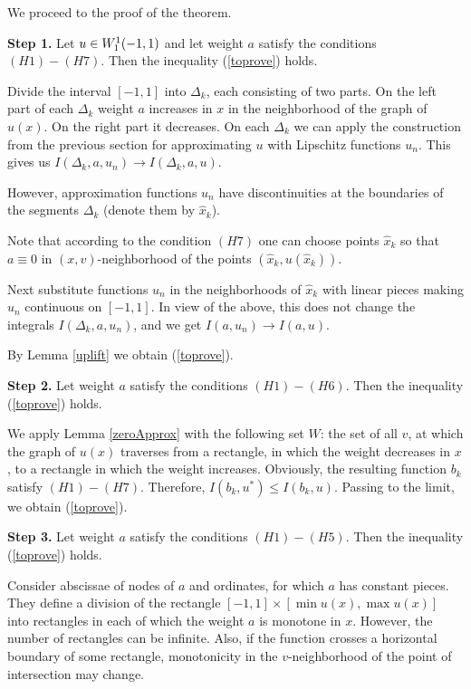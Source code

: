 We proceed to the proof of the theorem.

\bigskip
{\bf Step 1.} Let $u \in W_1^1(-1, 1)$ and let weight $a$ satisfy the conditions $(H1)-(H7)$.
Then the inequality (\ref{toprove}) holds.

Divide the interval $[-1, 1]$ into $\Delta_k$, each consisting of two parts.
On the left part of each $\Delta_k$ weight $a$ increases in $x$ in the neighborhood
of the graph of $u(x)$. On the right part it decreases.
On each $\Delta_k$ we can apply the construction from the previous section
for approximating $u$ with Lipschitz functions $u_n$.
This gives us $I(\Delta_k, a, u_n) \to I(\Delta_k, a, u)$.

However, approximation functions $u_n$ have discontinuities at the boundaries of the segments $\Delta_k$
(denote them by $\hat{x}_k$).

Note that according to the condition $(H7)$ one can choose points $\hat{x}_k$ so
that $a \equiv 0$ in $(x, v)$-neighborhood of the points $(\hat{x}_k, u(\hat{x}_k))$.

Next substitute functions $u_n$ in the neighborhoods of $\hat{x}_k$ with linear pieces
making $u_n$ continuous on $[-1, 1]$.
In view of the above, this does not change the integrals $I(\Delta_k, a, u_n)$,
and we get $I(a, u_n) \to I(a, u)$.

By Lemma \ref{uplift} we obtain (\ref{toprove}).

\bigskip

{\bf Step 2.} Let weight $a$ satisfy the conditions $(H1)-(H6)$.
Then the inequality (\ref{toprove}) holds.

We apply Lemma \ref{zeroApprox} with the following set $W$:
the set of all $v$, at which the graph of $u(x)$ traverses from a rectangle,
in which the weight decreases in $x$,
to a rectangle in which the weight increases.
Obviously, the resulting function $b_k$ satisfy $(H1)-(H7)$.
Therefore, $I(b_k, u^*) \le I(b_k, u)$.
Passing to the limit, we obtain (\ref{toprove}).

\bigskip

{\bf Step 3.} Let weight $a$ satisfy the conditions $(H1)-(H5)$.
Then the inequality (\ref{toprove}) holds.

Consider abscissae of nodes of $a$
and ordinates, for which $a$ has constant pieces.
They define a division of the rectangle $[-1, 1] \times [\min u(x), \max u(x)]$
into rectangles in each of which the weight $a$ is monotone in $x$.
However, the number of rectangles can be infinite.
Also, if the function crosses a horizontal boundary of some rectangle,
monotonicity in the $v$-neighborhood of the point of intersection may change.

